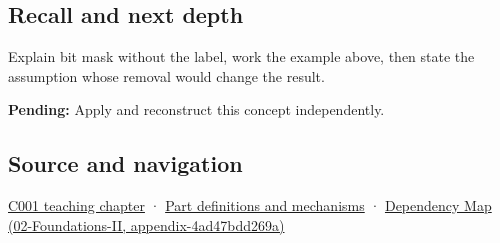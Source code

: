 \subsection{Recall and next depth}\label{appendix-dbe5905163c2-recall-and-next-depth}

Explain bit mask without the label, work the example above, then state the assumption whose removal would change the result.

\textbf{Pending:} Apply and reconstruct this concept independently.

\subsection{Source and navigation}\label{appendix-dbe5905163c2-source-and-navigation}

\hyperref[01-foundations-i-ch001-from-a-signal-to-an-interpretation]{C001 teaching chapter} · \hyperref[appendix-fd090d982a15]{Part definitions and mechanisms} · \href{../02-Foundations-II/main.pdf\#nameddest=appendix-4ad47bdd269a}{Dependency Map (02-Foundations-II, appendix-4ad47bdd269a)}
